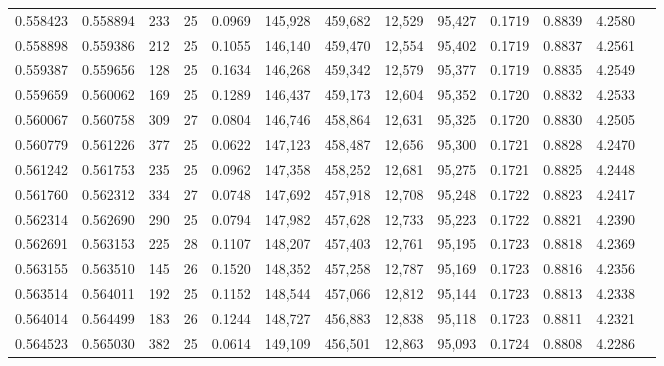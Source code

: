 \begin{tabular}{rrrrrrrrrrrrr}
0.558423 & 0.558894 &   233 &  25 &                                     0.0969 & 145,928 & 459,682 &  12,529 &  95,427 & 0.1719 & 0.8839 & 4.2580 \\
0.558898 & 0.559386 &   212 &  25 &                                     0.1055 & 146,140 & 459,470 &  12,554 &  95,402 & 0.1719 & 0.8837 & 4.2561 \\
0.559387 & 0.559656 &   128 &  25 &                                     0.1634 & 146,268 & 459,342 &  12,579 &  95,377 & 0.1719 & 0.8835 & 4.2549 \\
0.559659 & 0.560062 &   169 &  25 &                                     0.1289 & 146,437 & 459,173 &  12,604 &  95,352 & 0.1720 & 0.8832 & 4.2533 \\
0.560067 & 0.560758 &   309 &  27 &                                     0.0804 & 146,746 & 458,864 &  12,631 &  95,325 & 0.1720 & 0.8830 & 4.2505 \\
0.560779 & 0.561226 &   377 &  25 &                                     0.0622 & 147,123 & 458,487 &  12,656 &  95,300 & 0.1721 & 0.8828 & 4.2470 \\
0.561242 & 0.561753 &   235 &  25 &                                     0.0962 & 147,358 & 458,252 &  12,681 &  95,275 & 0.1721 & 0.8825 & 4.2448 \\
0.561760 & 0.562312 &   334 &  27 &                                     0.0748 & 147,692 & 457,918 &  12,708 &  95,248 & 0.1722 & 0.8823 & 4.2417 \\
0.562314 & 0.562690 &   290 &  25 &                                     0.0794 & 147,982 & 457,628 &  12,733 &  95,223 & 0.1722 & 0.8821 & 4.2390 \\
0.562691 & 0.563153 &   225 &  28 &                                     0.1107 & 148,207 & 457,403 &  12,761 &  95,195 & 0.1723 & 0.8818 & 4.2369 \\
0.563155 & 0.563510 &   145 &  26 &                                     0.1520 & 148,352 & 457,258 &  12,787 &  95,169 & 0.1723 & 0.8816 & 4.2356 \\
0.563514 & 0.564011 &   192 &  25 &                                     0.1152 & 148,544 & 457,066 &  12,812 &  95,144 & 0.1723 & 0.8813 & 4.2338 \\
0.564014 & 0.564499 &   183 &  26 &                                     0.1244 & 148,727 & 456,883 &  12,838 &  95,118 & 0.1723 & 0.8811 & 4.2321 \\
0.564523 & 0.565030 &   382 &  25 &                                     0.0614 & 149,109 & 456,501 &  12,863 &  95,093 & 0.1724 & 0.8808 & 4.2286 \\

\end{tabular}
